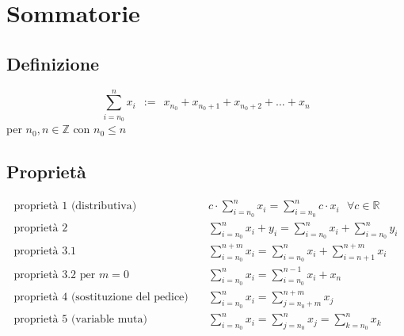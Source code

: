 \documentclass[a4paper]{article}
\begin{document}
\newpage

\section{Sommatorie}
\subsection{Definizione}
\[\sum_{i = n_0} ^ {n} x_i \ \  := \ \  x_{n_0} + x_{n_0+1} + x_{n_0+2} + \dots + x_n\] per \(n_0, n \in \mathbb{Z}\) con \(n_0 \leq n\)


\subsection{Proprietà}
\begin{align*}
	\text{proprietà 1 (distributiva)} \quad & c \cdot \sum_{i = n_0} ^ {n} x_i = \sum_{i = n_0} ^ {n} c \cdot x_i \ \ \  \forall c \in \mathbb{R} \\
	\text{proprietà 2} \quad & \sum_{i = n_0} ^ {n} x_i + y_i = \sum_{i = n_0} ^ {n} x_i + \sum_{i = n_0} ^ {n} y_i \\
	\text{proprietà 3.1} \quad & \sum_{i = n_0} ^ {n + m} x_i = \sum_{i = n_0} ^ {n} x_i + \sum_{i = n + 1} ^ {n + m} x_i \\
	\text{proprietà 3.2 per \(m = 0\)} \quad & \sum_{i = n_0} ^ {n} x_i = \sum_{i = n_0} ^ {n-1} x_i + x_n \\
	\text{proprietà 4 (sostituzione del pedice)} \quad & \sum_{i = n_0} ^ {n} x_i = \sum_{j = n_0 + m} ^ {n + m} x_j \\
	\text{proprietà 5 (variable muta)} \quad & \sum_{i = n_0} ^ {n} x_i = \sum_{j = n_0} ^ {n} x_j = \sum_{k = n_0} ^ {n} x_k
\end{align*}
\end{document}
